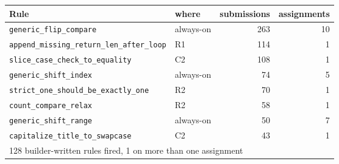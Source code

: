 \begin{tabular}{llrr}
\toprule
Rule & where & submissions & assignments \\
\midrule
\texttt{generic\_flip\_compare} & always-on & 263 & 10 \\
\texttt{append\_missing\_return\_len\_after\_loop} & R1 & 114 & 1 \\
\texttt{slice\_case\_check\_to\_equality} & C2 & 108 & 1 \\
\texttt{generic\_shift\_index} & always-on & 74 & 5 \\
\texttt{strict\_one\_should\_be\_exactly\_one} & R2 & 70 & 1 \\
\texttt{count\_compare\_relax} & R2 & 58 & 1 \\
\texttt{generic\_shift\_range} & always-on & 50 & 7 \\
\texttt{capitalize\_title\_to\_swapcase} & C2 & 43 & 1 \\
\midrule
\multicolumn{4}{l}{128 builder-written rules fired, 1 on more than one assignment} \\
\bottomrule
\end{tabular}
